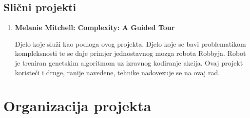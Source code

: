 \documentclass[times, utf8, numeric]{fer}
\begin{document}
\section{Slični projekti}
\begin{enumerate}
\item \begin{flushleft} \textbf{Melanie Mitchell: Complexity: A Guided Tour}\end{flushleft} 
Djelo koje služi kao podloga ovog projekta. Djelo koje se bavi problematikom kompleksnosti te se daje primjer jednostavnog mozga robota Robbyja. Robot je treniran genetskim algoritmom uz izravnog kodiranje akcija. Ovaj projekt koristeći i druge, ranije navedene, tehnike nadovezuje se na ovaj rad.
\end{enumerate}

\chapter{Organizacija projekta}
\end{document}
